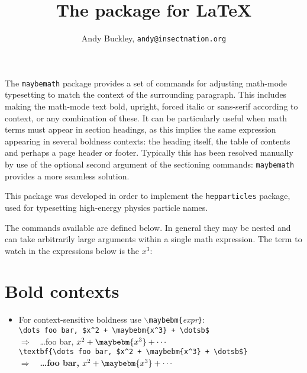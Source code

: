 \documentclass[12pt]{article}
\author{Andy Buckley, \texttt{andy@insectnation.org}}
\title{The \maybemath package for \LaTeX}
\newcommand{\maybemath}{\texttt{maybemath}\xspace}
\newcommand{\manifestsAs}{\ensuremath{\Rightarrow\quad}\xspace}
\newcommand{\texcommand}[1]{\texttt{\ensuremath{\backslash{}}{#1}}\xspace}
\newcommand{\texarg}[1]{\ensuremath{\!}\texttt{\{}\textit{#1}\texttt{\}}\xspace}
\newcommand{\maybebmName}{\texcommand{maybebm}}
\begin{document}
\maketitle

The \maybemath package provides a set of commands for adjusting math-mode
typesetting to match the context of the surrounding paragraph. This includes
making the math-mode text bold, upright, forced italic or sans-serif according
to context, or any combination of these. It can be particularly useful when math
terms must appear in section headings, as this implies the same expression
appearing in several boldness contexts: the heading itself, the table of
contents and perhaps a page header or footer. Typically this has been resolved
manually by use of the optional second argument of the sectioning commands:
\maybemath provides a more seamless solution.

This package was developed in order to implement the \texttt{hepparticles}
package, used for typesetting high-energy physics particle names. 

The commands available are defined below. In general they may be nested and can
take arbitrarily large arguments within a single math expression. The term to
watch in the expressions below is the $x^3$:

\section{Bold contexts}
\begin{itemize}
\item For context-sensitive boldness use \maybebmName\texarg{expr}:\\
  {\verb|\dots foo bar, $x^2 + \maybebm{x^3} + \dotsb$|}\\ \manifestsAs {\dots foo bar, $x^2 + \maybebm{x^3} + \dotsb$}\\
  {\verb|\textbf{\dots foo bar, $x^2 + \maybebm{x^3} + \dotsb$}|}\\ \manifestsAs \textbf{\dots foo bar, $x^2 + \maybebm{x^3} + \dotsb$}
\end{itemize}
\end{document}
